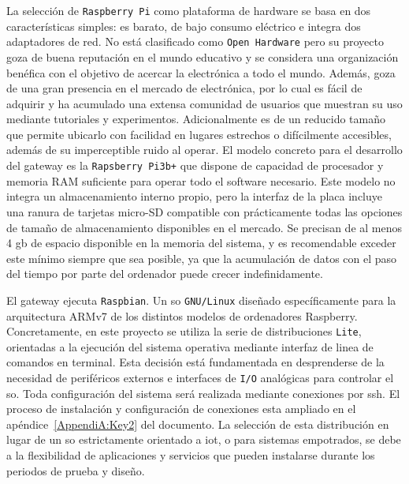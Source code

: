 La selección de \verb|Raspberry Pi| como plataforma de hardware se basa en dos características simples: es barato, de bajo consumo eléctrico e integra dos adaptadores de red. No está clasificado como \verb|Open Hardware| pero su proyecto goza de buena reputación en el mundo educativo y se considera una organización benéfica con el objetivo de acercar la electrónica a todo el mundo. Además, goza de una gran presencia en el mercado de electrónica, por lo cual es fácil de adquirir y ha acumulado una extensa comunidad de usuarios que muestran su uso mediante tutoriales y experimentos. Adicionalmente es de un reducido tamaño que permite ubicarlo con facilidad en lugares estrechos o difícilmente accesibles, además de su imperceptible ruido al operar. El modelo concreto para el desarrollo del \gls{gateway} es la \verb|Rapsberry Pi3b+| que dispone de capacidad de procesador y memoria RAM suficiente para operar todo el software necesario. Este modelo no integra un almacenamiento interno propio, pero la interfaz de la placa incluye una ranura de tarjetas micro-SD compatible con prácticamente todas las opciones de tamaño de almacenamiento disponibles en el mercado. Se precisan de al menos 4 \gls{gb} de espacio disponible en la memoria del sistema, y es recomendable exceder este mínimo siempre que sea posible, ya que la acumulación de datos con el paso del tiempo por parte del ordenador puede crecer indefinidamente.

\vspace{1cm}

El \gls{gateway} ejecuta \verb|Raspbian|. Un \gls{so} \verb|GNU/Linux| diseñado específicamente para la arquitectura ARMv7 de los distintos modelos de ordenadores Raspberry. Concretamente, en este proyecto se utiliza la serie de distribuciones \verb|Lite|, orientadas a la ejecución del sistema operativa mediante interfaz de linea de comandos en terminal. Esta decisión está fundamentada en desprenderse de la necesidad de periféricos externos e interfaces de \verb|I/O| analógicas para controlar el \gls{so}. Toda configuración del sistema será realizada mediante conexiones por \gls{ssh}. El proceso de instalación y configuración de conexiones esta ampliado en el apéndice~\ref{AppendiA:Key2} del documento. La selección de esta distribución en lugar de un \gls{so} estrictamente orientado a \gls{iot}, o para sistemas empotrados, se debe a la flexibilidad de aplicaciones y servicios que pueden instalarse durante los periodos de prueba y diseño.

\vspace{1cm}

